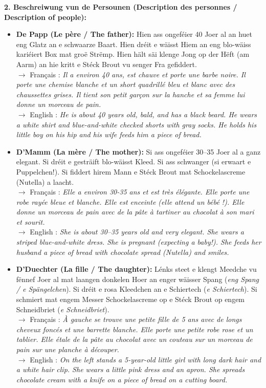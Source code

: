 \noindent\textbf{2. Beschreiwung vun de Persounen (Description des personnes / Description of people):}
\begin{itemize}
    \item \textbf{De Papp (Le père / The father):} Hien ass ongeféier 40 Joer al an huet eng Glatz an e schwaarze Baart. Hien dréit e wäisst Hiem an eng blo-wäiss kariéiert Box mat groë Strëmp. Hien hält säi klenge Jong op der Hëft (am Aarm) an hie kritt e Stéck Brout vu senger Fra gefiddert.\\
    $\rightarrow$ Français : \textit{Il a environ 40 ans, est chauve et porte une barbe noire. Il porte une chemise blanche et un short quadrillé bleu et blanc avec des chaussettes grises. Il tient son petit garçon sur la hanche et sa femme lui donne un morceau de pain.}\\
    $\rightarrow$ English : \textit{He is about 40 years old, bald, and has a black beard. He wears a white shirt and blue-and-white checked shorts with gray socks. He holds his little boy on his hip and his wife feeds him a piece of bread.}
    
    \item \textbf{D'Mamm (La mère / The mother):} Si ass ongeféier 30–35 Joer al a ganz elegant. Si dréit e gesträift blo-wäisst Kleed. Si ass schwanger (si erwaart e Puppelchen!). Si fiddert hirem Mann e Stéck Brout mat Schockelascreme (Nutella) a laacht.\\
    $\rightarrow$ Français : \textit{Elle a environ 30-35 ans et est très élégante. Elle porte une robe rayée bleue et blanche. Elle est enceinte (elle attend un bébé !). Elle donne un morceau de pain avec de la pâte à tartiner au chocolat à son mari et sourit.}\\
    $\rightarrow$ English : \textit{She is about 30–35 years old and very elegant. She wears a striped blue-and-white dress. She is pregnant (expecting a baby!). She feeds her husband a piece of bread with chocolate spread (Nutella) and smiles.}
    
    \item \textbf{D'Duechter (La fille / The daughter):} Lénks steet e klengt Meedche vu fënnef Joer al mat laangen donkelen Hoer an enger wäisser Spang (\textit{eng Spang / e Spängelchen}). Si dréit e rosa Kleedchen an e Schiertech (\textit{e Schiertech}). Si schmiert mat engem Messer Schockelascreme op e Stéck Brout op engem Schneidbriet (\textit{e Schneidbriet}).\\
    $\rightarrow$ Français : \textit{À gauche se trouve une petite fille de 5 ans avec de longs cheveux foncés et une barrette blanche. Elle porte une petite robe rose et un tablier. Elle étale de la pâte au chocolat avec un couteau sur un morceau de pain sur une planche à découper.}\\
    $\rightarrow$ English : \textit{On the left stands a 5-year-old little girl with long dark hair and a white hair clip. She wears a little pink dress and an apron. She spreads chocolate cream with a knife on a piece of bread on a cutting board.}
    

\end{itemize}
